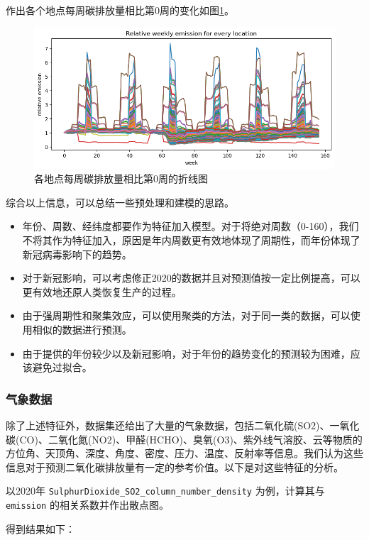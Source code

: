 \documentclass{ctexart}
\begin{document}
作出各个地点每周碳排放量相比第0周的变化如图\ref{fig:6}。

\begin{figure}[H]
      \centering
      \includegraphics[width=1\textwidth]{output6.png}
      \caption{\label{fig:6}各地点每周碳排放量相比第0周的折线图}
\end{figure}

综合以上信息，可以总结一些预处理和建模的思路。
\begin{itemize}
      \item 年份、周数、经纬度都要作为特征加入模型。对于将绝对周数（0-160），我们不将其作为特征加入，原因是年内周数更有效地体现了周期性，而年份体现了新冠病毒影响下的趋势。
      \item 对于新冠影响，可以考虑修正2020的数据并且对预测值按一定比例提高，可以更有效地还原人类恢复生产的过程。
      \item 由于强周期性和聚集效应，可以使用聚类的方法，对于同一类的数据，可以使用相似的数据进行预测。
      \item 由于提供的年份较少以及新冠影响，对于年份的趋势变化的预测较为困难，应该避免过拟合。
\end{itemize}

\subsubsection{气象数据}

除了上述特征外，数据集还给出了大量的气象数据，包括二氧化硫(SO2)、一氧化碳(CO)、二氧化氮(NO2)、甲醛(HCHO)、臭氧(O3)、紫外线气溶胶、云等物质的方位角、天顶角、深度、角度、密度、压力、温度、反射率等信息。我们认为这些信息对于预测二氧化碳排放量有一定的参考价值。以下是对这些特征的分析。

以2020年 \texttt{SulphurDioxide\_SO2\_column\_number\_density} 为例，计算其与 \texttt{emission} 的相关系数并作出散点图。

得到结果如下：
\end{document}
